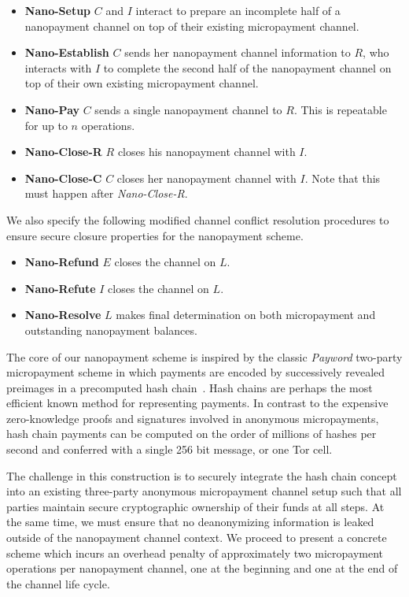\begin{itemize}
\item \textbf{Nano-Setup} $C$ and $I$ interact to prepare an incomplete half of
  a nanopayment channel on top of their existing micropayment channel.
\item \textbf{Nano-Establish} $C$ sends her nanopayment channel information to
  $R$, who interacts with $I$ to complete the second half of the nanopayment
  channel on top of their own existing micropayment channel.
\item \textbf{Nano-Pay} $C$ sends a single nanopayment channel to $R$. This is
  repeatable for up to $n$ operations.
\item \textbf{Nano-Close-R} $R$ closes his nanopayment channel with $I$.
\item \textbf{Nano-Close-C} $C$ closes her nanopayment channel with $I$. Note that
  this must happen after \emph{Nano-Close-R}.
\end{itemize}

We also specify the following modified channel conflict resolution procedures to
ensure secure closure properties for the nanopayment scheme.

\begin{itemize}
\item \textbf{Nano-Refund} $E$ closes the channel on $L$.
\item \textbf{Nano-Refute} $I$ closes the channel on $L$.
\item \textbf{Nano-Resolve} $L$ makes final determination on both micropayment and
  outstanding nanopayment balances.
\end{itemize}

The core of our nanopayment scheme is inspired by the classic \emph{Payword}
two-party micropayment scheme in which payments are encoded by successively
revealed preimages in a precomputed hash chain~\cite{rivest1996payword}. Hash
chains are perhaps the most efficient known method for representing payments. In
contrast to the expensive zero-knowledge proofs and signatures involved in
anonymous micropayments, hash chain payments can be computed on the order of
millions of hashes per second and conferred with a single 256 bit message, or
one Tor cell.

The challenge in this construction is to securely integrate the hash chain
concept into an existing three-party anonymous micropayment channel setup such
that all parties maintain secure cryptographic ownership of their funds at all
steps. At the same time, we must ensure that no deanonymizing information is
leaked outside of the nanopayment channel context. We proceed to present a
concrete scheme which incurs an overhead penalty of approximately two
micropayment operations per nanopayment channel, one at the beginning and one at
the end of the channel life cycle.

